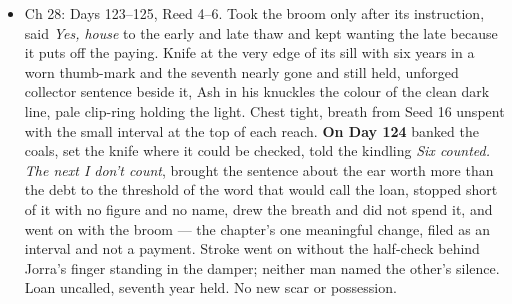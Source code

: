 \documentclass{design/chronicle}
\begin{document}
{\begin{itemize}[leftmargin=1.4em,itemsep=1pt,topsep=3pt,parsep=0pt]
\item Ch 28: Days 123–125, Reed 4–6. Took the broom only after its instruction, said \emph{Yes, house} to the early and late thaw and kept wanting the late because it puts off the paying. Knife at the very edge of its sill with six years in a worn thumb-mark and the seventh nearly gone and still held, unforged collector sentence beside it, Ash in his knuckles the colour of the clean dark line, pale clip-ring holding the light. Chest tight, breath from Seed 16 unspent with the small interval at the top of each reach. \textbf{On Day 124} banked the coals, set the knife where it could be checked, told the kindling \emph{Six counted. The next I don’t count}, brought the sentence about the ear worth more than the debt to the threshold of the word that would call the loan, stopped short of it with no figure and no name, drew the breath and did not spend it, and went on with the broom — the chapter’s one meaningful change, filed as an interval and not a payment. Stroke went on without the half-check behind Jorra’s finger standing in the damper; neither man named the other’s silence. Loan uncalled, seventh year held. No new scar or possession.

\end{itemize}

\begin{itemize}[leftmargin=1.4em,itemsep=1pt,topsep=3pt,parsep=0pt]


\end{itemize}}
\end{document}
